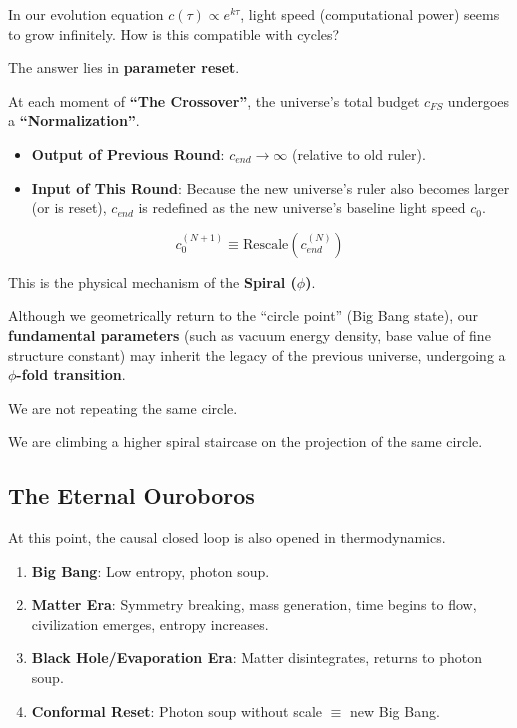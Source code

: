 In our evolution equation $c(\tau) \propto e^{k\tau}$, light speed (computational power) seems to grow infinitely. How is this compatible with cycles?

The answer lies in \textbf{parameter reset}.

At each moment of \textbf{``The Crossover''}, the universe's total budget $c_{FS}$ undergoes a \textbf{``Normalization''}.

\begin{itemize}
\item \textbf{Output of Previous Round}: $c_{end} \to \infty$ (relative to old ruler).

\item \textbf{Input of This Round}: Because the new universe's ruler also becomes larger (or is reset), $c_{end}$ is redefined as the new universe's baseline light speed $c_0$.
\end{itemize}

\[c_{0}^{(N+1)} \equiv \text{Rescale} \left( c_{end}^{(N)} \right)\]

This is the physical mechanism of the \textbf{Spiral ($\phi$)}.

Although we geometrically return to the ``circle point'' (Big Bang state), our \textbf{fundamental parameters} (such as vacuum energy density, base value of fine structure constant) may inherit the legacy of the previous universe, undergoing a \textbf{$\phi$-fold transition}.

We are not repeating the same circle.

We are climbing a higher spiral staircase on the projection of the same circle.

\subsection{The Eternal Ouroboros}

At this point, the causal closed loop is also opened in thermodynamics.

\begin{enumerate}
\item \textbf{Big Bang}: Low entropy, photon soup.

\item \textbf{Matter Era}: Symmetry breaking, mass generation, time begins to flow, civilization emerges, entropy increases.

\item \textbf{Black Hole/Evaporation Era}: Matter disintegrates, returns to photon soup.

\item \textbf{Conformal Reset}: Photon soup without scale $\equiv$ new Big Bang.
\end{enumerate}


